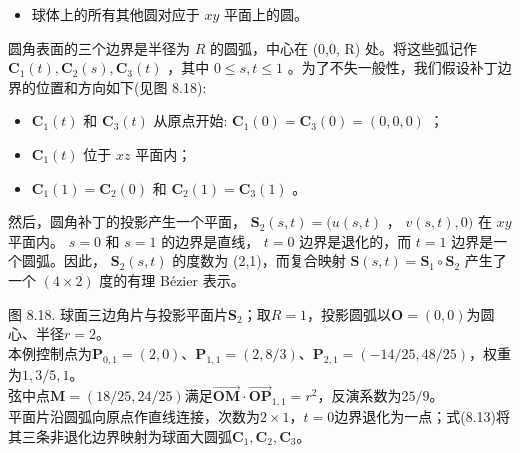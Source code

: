 \documentclass[../main.tex]{subfiles}
\begin{document}
\begin{itemize}
\item 球体上的所有其他圆对应于 \({xy}\) 平面上的圆。
\end{itemize}

圆角表面的三个边界是半径为 \(R\) 的圆弧，中心在 (0,0, R) 处。将这些弧记作 \({\mathbf{C}}_{1}\left( t\right) ,{\mathbf{C}}_{2}\left( s\right) ,{\mathbf{C}}_{3}\left( t\right)\) ，其中 \(0 \leq  s,t \leq  1\) 。为了不失一般性，我们假设补丁边界的位置和方向如下(见图 8.18):

\begin{itemize}
\item \({\mathbf{C}}_{1}\left( t\right)\) 和 \({\mathbf{C}}_{3}\left( t\right)\) 从原点开始: \({\mathbf{C}}_{1}\left( 0\right)  = {\mathbf{C}}_{3}\left( 0\right)  = \left( {0,0,0}\right)\) ；
\end{itemize}

\begin{itemize}
\item \({\mathbf{C}}_{1}\left( t\right)\) 位于 \({xz}\) 平面内；
\end{itemize}

\begin{itemize}
\item \({\mathbf{C}}_{1}\left( 1\right)  = {\mathbf{C}}_{2}\left( 0\right)\) 和 \({\mathbf{C}}_{2}\left( 1\right)  = {\mathbf{C}}_{3}\left( 1\right)\) 。
\end{itemize}

然后，圆角补丁的投影产生一个平面， \({\mathbf{S}}_{2}\left( {s,t}\right)  = (u\left( {s,t}\right)\) ， \(v\left( {s,t}\right) ,0)\) 在 \({xy}\) 平面内。 \(s = 0\) 和 \(s = 1\) 的边界是直线， \(t = 0\) 边界是退化的，而 \(t = 1\) 边界是一个圆弧。因此， \({\mathbf{S}}_{2}\left( {s,t}\right)\) 的度数为 (2,1)，而复合映射 \(\mathbf{S}\left( {s,t}\right)  = {\mathbf{S}}_{1} \circ  {\mathbf{S}}_{2}\) 产生了一个 \(\left( {4 \times  2}\right)\) 度的有理 Bézier 表示。

\begin{center}
\begin{minipage}{30cm}
\vspace*{.6\baselineskip}
\centering
{}
\par\smallskip
图 8.18. 球面三边角片与投影平面片$\mathbf S_2$；取$R=1$，投影圆弧以$\mathbf O=(0,0)$为圆心、半径$r=2$。\\
本例控制点为$\mathbf P_{0,1}=(2,0)$、$\mathbf P_{1,1}=(2,8/3)$、$\mathbf P_{2,1}=(-14/25,48/25)$，权重为$1,3/5,1$。\\
弦中点$\mathbf M=(18/25,24/25)$满足$\overrightarrow{\mathbf{OM}}\cdot\overrightarrow{\mathbf{OP}}_{1,1}=r^2$，反演系数为$25/9$。\\
平面片沿圆弧向原点作直线连接，次数为$2\times1$，$t=0$边界退化为一点；式(8.13)将其三条非退化边界映射为球面大圆弧$\mathbf C_1,\mathbf C_2,\mathbf C_3$。
\end{minipage}
\end{center}
\end{document}
